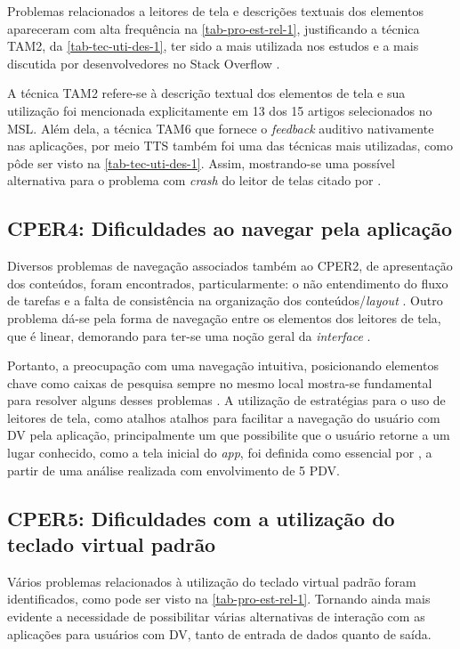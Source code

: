 Problemas relacionados a leitores de tela e descrições textuais dos elementos apareceram com alta frequência na \autoref{tab-pro-est-rel-1},
justificando a técnica TAM2, da \autoref{tab-tec-uti-des-1}, ter sido a mais utilizada nos estudos e a mais discutida por
desenvolvedores no Stack Overflow \cite{Vendome201941}.

A técnica TAM2 refere-se à descrição textual dos elementos de tela e sua utilização foi mencionada explicitamente em 13 dos
15 artigos selecionados no MSL\@. Além dela, a técnica TAM6 que fornece o \emph{feedback} auditivo nativamente nas aplicações,
por meio TTS também foi uma das técnicas mais utilizadas, como pôde ser visto na \autoref{tab-tec-uti-des-1}. Assim, mostrando-se
uma possível alternativa para o problema com \emph{crash} do leitor de telas citado por .

\subsection{CPER4: Dificuldades ao navegar pela aplicação}

Diversos problemas de navegação associados também ao CPER2, de apresentação dos conteúdos, foram encontrados, particularmente:
o não entendimento do fluxo de tarefas e a falta de consistência na organização dos conteúdos/\emph{layout}
\cite{Shera2021285,Christoph2020,Quispe2020}. Outro problema dá-se pela forma de navegação entre os elementos dos leitores de tela,
que é linear, demorando para ter-se uma noção geral da \emph{interface} \cite{Damaceno2016}.

Portanto, a preocupação com uma navegação intuitiva, posicionando elementos chave como caixas de pesquisa sempre no mesmo
local mostra-se fundamental para resolver alguns desses problemas \cite{Kim20191103,Mascetti2019,Ducci2018}.
A utilização de estratégias para o uso de leitores de tela, como atalhos atalhos para facilitar a navegação do usuário com DV
pela aplicação, principalmente um que possibilite que o usuário retorne a um lugar conhecido, como a tela inicial do \emph{app},
foi definida como essencial por , a partir de uma análise realizada com envolvimento de 5 PDV\@.

\subsection{CPER5: Dificuldades com a utilização do teclado virtual padrão}

Vários problemas relacionados à utilização do teclado virtual padrão foram identificados, como pode ser visto na
\autoref{tab-pro-est-rel-1}. Tornando ainda mais evidente a necessidade de possibilitar várias alternativas de interação
com as aplicações para usuários com DV\@, tanto de entrada de dados quanto de saída.


